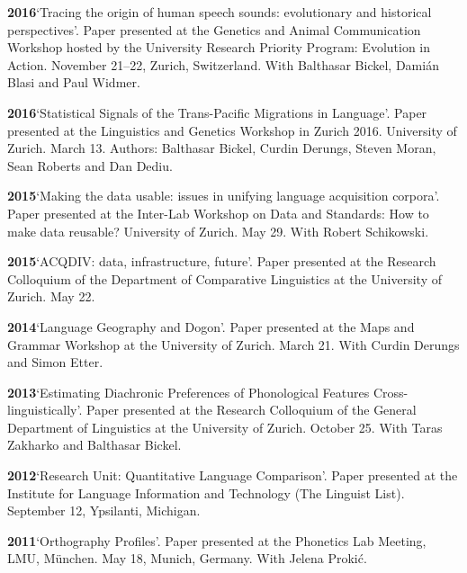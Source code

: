 \documentclass[11pt]{article}
\newcommand{\hangpara}{
 \setlength{\parindent}{0in} %
 \hangindent=0.42in %
}
\begin{document}
\hangpara
\vskip 6pt
{\bf 2016}\hspace{1ex}`Tracing the origin of human speech sounds: evolutionary and historical perspectives'. Paper presented at the Genetics and Animal Communication Workshop hosted by the University Research Priority Program: Evolution in Action. November 21--22, Zurich, Switzerland. With Balthasar Bickel, Dami{\'a}n Blasi and Paul Widmer.

\hangpara
\vskip 6pt
{\bf 2016}\hspace{1ex}`Statistical Signals of the Trans-Pacific Migrations in Language'. Paper presented at the Linguistics and Genetics Workshop in Zurich 2016. University of Zurich. March 13. Authors: Balthasar Bickel, Curdin Derungs, Steven Moran, Sean Roberts and Dan Dediu.

\hangpara
\vskip 6pt
{\bf 2015}\hspace{1ex}`Making the data usable: issues in unifying language acquisition corpora'. Paper presented at the Inter-Lab Workshop on Data and Standards: How to make data reusable? University of Zurich. May 29. With Robert Schikowski.

\vskip 6pt
\hangpara
{\bf 2015}\hspace{1ex}`ACQDIV: data, infrastructure, future'. Paper presented at the Research Colloquium of the Department of Comparative Linguistics at the University of Zurich. May 22.

\vskip 6pt
\hangpara
{\bf 2014}\hspace{1ex}`Language Geography and Dogon'. Paper presented at the Maps and Grammar Workshop at the University of Zurich. March 21. With Curdin Derungs and Simon Etter.

\vskip 6pt
\hangpara
{\bf 2013}\hspace{1ex}`Estimating Diachronic Preferences of Phonological Features Cross-linguistically'. Paper presented at the Research Colloquium of the General Department of Linguistics at the University of Zurich. October 25. With Taras Zakharko and Balthasar Bickel.

\vskip 6pt
\hangpara
{\bf 2012}\hspace{1ex}`Research Unit: Quantitative Language Comparison'. Paper presented at the Institute for Language Information and Technology (The Linguist List). September 12, Ypsilanti, Michigan.

\vskip 6pt
\hangpara
{\bf 2011}\hspace{1ex}`Orthography Profiles'. Paper presented at the Phonetics Lab Meeting, LMU, M{\"u}nchen. May 18, Munich, Germany. With Jelena Proki{\'c}.
\end{document}
